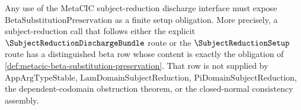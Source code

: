 \begin{proposition}
\label{prop:metacic-beta-substitution-preservation-mandatory-discharge-row}
Any use of the MetaCIC subject-reduction discharge interface must expose $\mathrm{BetaSubstitutionPreservation}$ as a finite setup obligation. More precisely, a subject-reduction call that follows either the explicit $\SubjectReductionDischargeBundle$ route or the $\SubjectReductionSetup$ route has a distinguished beta row whose content is exactly the obligation of \autoref{def:metacic-beta-substitution-preservation}. That row is not supplied by $\mathrm{AppArgTypeStable}$, $\mathrm{LamDomainSubjectReduction}$, $\mathrm{PiDomainSubjectReduction}$, the dependent-codomain obstruction theorem, or the closed-normal consistency assembly.
\end{proposition}
